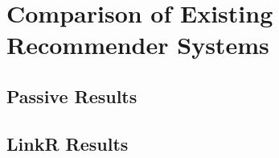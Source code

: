 \chapter{Comparison of Existing Recommender Systems}

\section {Passive Results}

\section{LinkR Results}